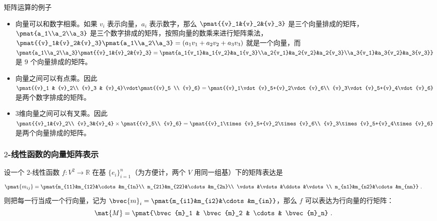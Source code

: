 \begin{example}{矩阵运算的例子}

\begin{itemize}
%
\item 向量可以和数字相乘。如果 ${v}_i$ 表示向量，$a_i$ 表示数字，那么 $\pmat{{v}_1&{v}_2&{v}_3}$ 是三个向量排成的矩阵，$\pmat{a_1\\a_2\\a_3}$ 是三个数字排成的矩阵，按照向量的数乘来进行矩阵乘法，$\pmat{{v}_1&{v}_2&{v}_3}\pmat{a_1\\a_2\\a_3}=(a_1{v}_1+a_2{v}_2+a_3{v}_3)$ 就是一个向量，而 $\pmat{a_1\\a_2\\a_3}\pmat{{v}_1&{v}_2&{v}_3}=\pmat{a_1{v_1}&a_1{v_2}&a_1{v_3}\\a_2{v_1}&a_2{v_2}&a_2{v_3}\\a_3{v_1}&a_3{v_2}&a_3{v_3}}$ 是 $9$ 个向量排成的矩阵。
\item 向量之间可以有点乘。因此 $\pmat{{v}_1 & {v}_2\\ {v}_3 & {v}_4}\vdot \pmat{{v}_5 \\ {v}_6}=\pmat{{v}_1\vdot{v}_5+{v}_2\vdot{v}_6\\ {v}_3\vdot{v}_5+{v}_4\vdot{v}_6}$ 是两个数字排成的矩阵。
\item 3维向量之间可以有叉乘。因此 $\pmat{{v}_1&{v}_2\\ {v}_3&{v}_4}\times\pmat{{v}_5\\ {v}_6}=\pmat{{v}_1\times{v}_5+{v}_2\times{v}_6\\ {v}_3\times{v}_5+{v}_4\times{v}_6}$ 是两个向量排成的矩阵。
\end{itemize}
\end{example}


\subsubsection{$2$-线性函数的向量矩阵表示}

设一个 $2$-线性函数 $f:V^2\rightarrow\mathbb{R}$ 在基 $\{{e}_i\}_{i=1}^n$（为方便计，两个 $V$ 用同一组基）下的矩阵表达是
\begin{equation}
\pmat{m_{ij}}=\pmat{m_{11}&m_{12}&\cdots&m_{1n}\\ m_{21}&m_{22}&\cdots&m_{2n}\\ \vdots&\vdots&\ddots&\vdots\\ m_{n1}&m_{n2}&\cdots&m_{nn}}~.
\end{equation}
则把每一行当成一个行向量，记为 $\bvec {m}_i = \pmat{m_{i1}&m_{i2}&\cdots&m_{in}}$，那么 $f$ 可以表达为行向量的行矩阵：
\begin{equation}\label{eq_Tensor_3}
\mat{M}=\pmat{\bvec{m}_1 & \bvec{m}_2 & \cdots & \bvec{m}_n}~.
\end{equation}


